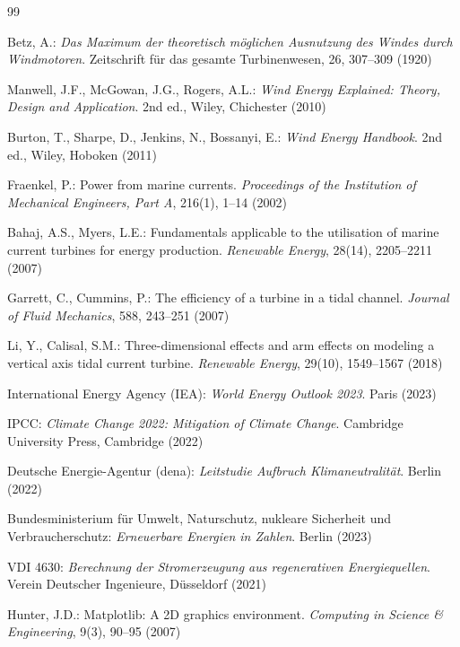 ﻿\documentclass[a4paper,12pt]{article}
\theoremstyle{definition}
\begin{document}
\begin{thebibliography}{99}

Betz, A.:
\textit{Das Maximum der theoretisch möglichen Ausnutzung des Windes durch Windmotoren}.
Zeitschrift für das gesamte Turbinenwesen, 26, 307--309 (1920)

Manwell, J.F., McGowan, J.G., Rogers, A.L.:
\textit{Wind Energy Explained: Theory, Design and Application}.
2nd ed., Wiley, Chichester (2010)

Burton, T., Sharpe, D., Jenkins, N., Bossanyi, E.:
\textit{Wind Energy Handbook}.
2nd ed., Wiley, Hoboken (2011)

Fraenkel, P.:
Power from marine currents.
\textit{Proceedings of the Institution of Mechanical Engineers, Part A}, 216(1), 1--14 (2002)

Bahaj, A.S., Myers, L.E.:
Fundamentals applicable to the utilisation of marine current turbines for energy production.
\textit{Renewable Energy}, 28(14), 2205--2211 (2007)

Garrett, C., Cummins, P.:
The efficiency of a turbine in a tidal channel.
\textit{Journal of Fluid Mechanics}, 588, 243--251 (2007)

Li, Y., Calisal, S.M.:
Three-dimensional effects and arm effects on modeling a vertical axis tidal current turbine.
\textit{Renewable Energy}, 29(10), 1549--1567 (2018)

International Energy Agency (IEA):
\textit{World Energy Outlook 2023}.
Paris (2023)

IPCC:
\textit{Climate Change 2022: Mitigation of Climate Change}.
Cambridge University Press, Cambridge (2022)

Deutsche Energie-Agentur (dena):
\textit{Leitstudie Aufbruch Klimaneutralität}.
Berlin (2022)

Bundesministerium für Umwelt, Naturschutz, nukleare Sicherheit und Verbraucherschutz:
\textit{Erneuerbare Energien in Zahlen}.
Berlin (2023)

VDI 4630:
\textit{Berechnung der Stromerzeugung aus regenerativen Energiequellen}.
Verein Deutscher Ingenieure, Düsseldorf (2021)

Hunter, J.D.:
Matplotlib: A 2D graphics environment.
\textit{Computing in Science \& Engineering}, 9(3), 90--95 (2007)


\end{thebibliography}
\end{document}
